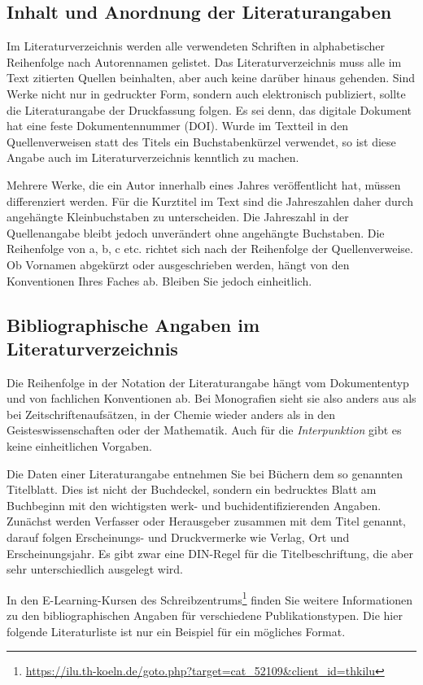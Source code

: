 \subsection{Inhalt und Anordnung der Literaturangaben}
\label{sec:bib-content}
Im Literaturverzeichnis werden alle verwendeten Schriften in alphabetischer Reihenfolge nach Autorennamen gelistet. Das Literaturverzeichnis muss alle im Text zitierten Quellen beinhalten, aber auch keine darüber hinaus gehenden. Sind Werke nicht nur in gedruckter Form, sondern auch elektronisch publiziert, sollte die Literaturangabe der Druckfassung folgen. Es sei denn, das digitale Dokument hat eine feste Dokumentennummer (DOI). Wurde im Textteil in den Quellenverweisen statt des Titels ein Buchstabenkürzel verwendet, so ist diese Angabe auch im Literaturverzeichnis kenntlich zu machen.
\par
Mehrere Werke, die ein Autor innerhalb eines Jahres veröffentlicht hat, müssen differenziert werden. Für die Kurztitel im Text sind die Jahreszahlen daher durch angehängte Kleinbuchstaben zu unterscheiden. Die Jahreszahl in der Quellenangabe bleibt jedoch unverändert ohne angehängte Buchstaben. Die Reihenfolge von a, b, c etc. richtet sich nach der Reihenfolge der Quellenverweise. Ob Vornamen abgekürzt oder ausgeschrieben werden, hängt von den Konventionen Ihres Faches ab. Bleiben Sie jedoch einheitlich.
%
\subsection{Bibliographische Angaben im Literaturverzeichnis}
Die Reihenfolge in der Notation der Literaturangabe hängt vom Dokumententyp und von fachlichen Konventionen ab. Bei Monografien sieht sie also anders aus als bei Zeitschriftenaufsätzen, in der Chemie wieder anders als in den Geisteswissenschaften oder der Mathematik. Auch für die \emph{Interpunktion} gibt es keine einheitlichen Vorgaben.
\par
Die Daten einer Literaturangabe entnehmen Sie bei Büchern dem so genannten Titelblatt. Dies ist nicht der Buchdeckel, sondern ein bedrucktes Blatt am Buchbeginn mit den wichtigsten werk- und buchidentifizierenden Angaben. Zunächst werden Verfasser oder Herausgeber zusammen mit dem Titel genannt, darauf folgen Erscheinungs- und Druckvermerke wie Verlag, Ort und Erscheinungsjahr. Es gibt zwar eine DIN-Regel für die Titelbeschriftung, die aber sehr unterschiedlich ausgelegt wird.
\par
In den E-Learning-Kursen des Schreibzentrums\footnote{\href{https://ilu.th-koeln.de/goto.php?target=cat\_52109\&client\_id=thkilu}{https://ilu.th-koeln.de/goto.php?target=cat\_52109\&client\_id=thkilu}} finden Sie weitere Informationen zu den bibliographischen Angaben für verschiedene Publikationstypen. Die hier folgende Literaturliste ist nur ein Beispiel für ein mögliches Format.